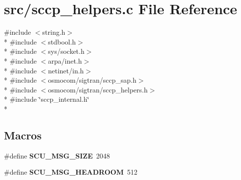 \section{src/sccp\+\_\+helpers.c File Reference}
\label{sccp__helpers_8c}
{\ttfamily \#include $<$string.\+h$>$}\\*
{\ttfamily \#include $<$stdbool.\+h$>$}\\*
{\ttfamily \#include $<$sys/socket.\+h$>$}\\*
{\ttfamily \#include $<$arpa/inet.\+h$>$}\\*
{\ttfamily \#include $<$netinet/in.\+h$>$}\\*
{\ttfamily \#include $<$osmocom/sigtran/sccp\+\_\+sap.\+h$>$}\\*
{\ttfamily \#include $<$osmocom/sigtran/sccp\+\_\+helpers.\+h$>$}\\*
{\ttfamily \#include \char`\"{}sccp\+\_\+internal.\+h\char`\"{}}\\*
\subsection*{Macros}
\begin{DoxyCompactItemize}
\item 
\#define {\bf S\+C\+U\+\_\+\+M\+S\+G\+\_\+\+S\+I\+ZE}~2048
\item 
\#define {\bf S\+C\+U\+\_\+\+M\+S\+G\+\_\+\+H\+E\+A\+D\+R\+O\+OM}~512
\end{DoxyCompactItemize}
